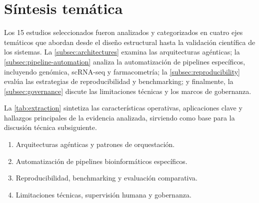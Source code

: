 
\section{Síntesis temática}\label{sec:synthesis}

Los 15 estudios seleccionados fueron analizados y categorizados en cuatro ejes
temáticos que abordan desde el diseño estructural hasta la validación científica
de los sistemas. La \cref{subsec:architectures} examina las arquitecturas
agénticas; la \cref{subsec:pipeline-automation} analiza la automatización de
pipelines específicos, incluyendo genómica, scRNA-seq y farmacometría; la
\cref{subsec:reproducibility} evalúa las estrategias de reproducibilidad y
benchmarking; y finalmente, la \cref{subsec:governance} discute las limitaciones
técnicas y los marcos de gobernanza.

La \cref{tab:extraction} sintetiza las características operativas, aplicaciones
clave y hallazgos principales de la evidencia analizada, sirviendo como base
para la discusión técnica subsiguiente.

\begin{enumerate}
  \item Arquitecturas agénticas y patrones de orquestación.
  \item Automatización de pipelines bioinformáticos específicos.
  \item Reproducibilidad, benchmarking y evaluación comparativa.
  \item Limitaciones técnicas, supervisión humana y gobernanza.
\end{enumerate}


